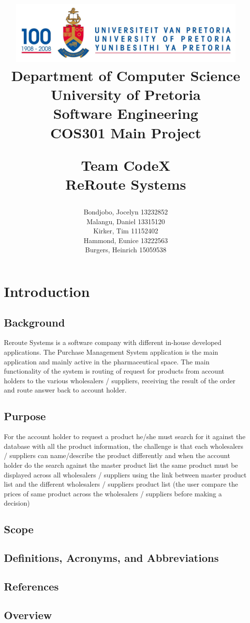 \documentclass[a4paper,10pt]{article}
\title{\includegraphics[width=12cm]{Eeufeeslogo.jpg} \\
       Department of Computer Science \\
       University of Pretoria \\
       \vspace{0.5cm}
       Software Engineering\\
       COS301 Main Project \\
       \vspace{0.5cm}
       \begin{large} \textbf{Team CodeX}\\ ReRoute Systems\end{large}}
\date{}
\author{	Bondjobo, Jocelyn 		13232852 		\\
		Malangu, Daniel		13315120		\\
		Kirker, Tim			11152402		\\
		Hammond, Eunice		13222563		\\
		Burgers, Heinrich		15059538		\\
}
\begin{document}
\maketitle
\thispagestyle{empty}
\clearpage

\newpage
{}
\thispagestyle{empty}
\tableofcontents
\clearpage

\newpage
{}

\section{Introduction}

	\subsection{Background} 
	Reroute Systems is a software company with different in-house developed applications. The Purchase Management System application is the main application and mainly active in the 		pharmaceutical space. The main functionality of the system is routing of request for products from account holders to the various wholesalers / suppliers, receiving the result of the order and route answer back to account holder.
	\subsection{Purpose} 	
	For the account holder to request a product he/she must search for it against the database with all the product information, the challenge is that each wholesalers / suppliers can name/describe the product differently and when the account holder do the search against the master product list the same product must be displayed across all wholesalers / suppliers using the link between master product list and the different wholesalers / suppliers product list (the user compare the prices of same product across the wholesalers / suppliers before making a decision)
	\subsection{Scope} 
	\subsection{Definitions, Acronyms, and Abbreviations} 
	\subsection{References} 
	\subsection{Overview} 
\end{document}
